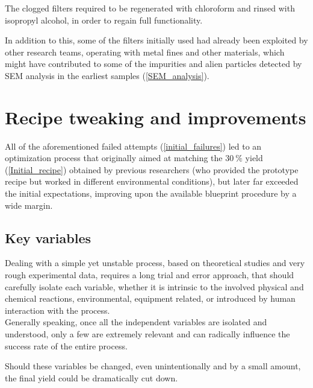 \documentclass{article}
\begin{document}
        The clogged filters required to be regenerated with chloroform and rinsed with isopropyl alcohol, in order to regain full 
        functionality. 

        In addition to this, some of the filters initially used had already been exploited by other research teams, operating 
        with metal fines and other materials, which might have contributed to some of the impurities and alien particles detected 
        by SEM analysis in the earliest samples (\ref{SEM_analysis}). \\ 




    \clearpage

    \section{Recipe tweaking and improvements\label{recipe_improvement}}

    All of the aforementioned failed attempts (\ref{initial_failures}) led to an optimization process that originally aimed at 
    matching the $30 \ \%$ yield (\ref{Initial_recipe}) obtained by previous researchers (who provided 
    the prototype recipe but worked in different environmental conditions), but later far exceeded the 
    initial expectations, improving upon the available blueprint procedure by a wide margin. 


        \subsection{Key variables\label{key_variables}}

        Dealing with a simple yet unstable process, based on theoretical studies and very rough experimental data, requires a
        long trial and error approach, that should carefully isolate each variable, whether it is intrinsic to the 
        involved physical and chemical reactions, environmental, equipment related, or introduced by human 
        interaction with the process. \\ 

        Generally speaking, once all the independent variables are isolated and understood, only a few are extremely relevant and can 
        radically influence the success rate of the entire process. 

        Should these variables be changed, even unintentionally and by a small amount, the final yield
        could be dramatically cut down. \\ 
\end{document}
